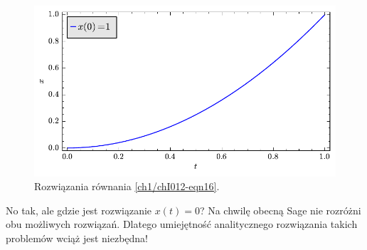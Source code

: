 \documentclass[a4paper,12pt,polish]{sphinxmanual}
\begin{document}
\begin{figure}[htbp]
\centering
\capstart

\includegraphics{sage_chI012_06.pdf}
\caption{Rozwiązania równania \eqref{ch1/chI012-eqn16}.}\end{figure}

No tak, ale gdzie jest rozwiązanie $x(t) = 0$? Na chwilę obecną Sage nie rozróżni obu możliwych rozwiązań. Dlatego umiejętność analitycznego rozwiązania takich problemów wciąż jest niezbędna!
\end{document}
